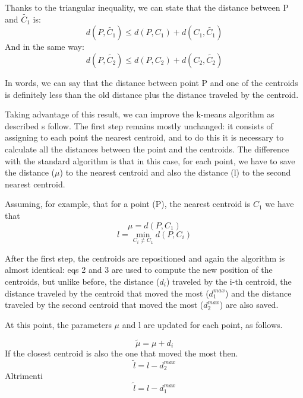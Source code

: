 \documentclass{report}
\begin{document}
\begin{minipage}[b]{0.48\textwidth}
  Thanks to the triangular inequality, we can state that the distance between P and $\tilde{C_1}$ is:
  \begin{equation}
      d(P, \tilde{C_1}) \leq d(P, C_1) + d(C_1, \tilde{C_1})
  \end{equation}
  And in the same way:
  \begin{equation}
    d(P, \tilde{C_2}) \leq d(P, C_2) + d(C_2, \tilde{C_2})
  \end{equation}

  In words, we can say that the distance between point P and one of the centroids is definitely less than the old distance plus the distance traveled by the centroid.

  Taking advantage of this result, we can improve the k-means algorithm as described s follow.
  The first step remains mostly unchanged: it consists of assigning to each point the nearest centroid, and to do this it is necessary to calculate all the distances between the point and the centroids. The difference with the standard algorithm is that in this case, for each point, we have to save the distance ($\mu$) to the nearest centroid and also the distance (l) to the second nearest centroid.

  Assuming, for example, that for a point (P), the nearest centroid is $C_1$ we have that
  \begin{equation}
      \mu = d(P, C_1)
  \end{equation}
  \begin{equation}
      l = \min\limits_{C_i \neq C_1} d(P, C_i)
  \end{equation}

  After the first step, the centroids are repositioned and again the algorithm is almost identical: eqs 2 and 3 are used to compute the new position of the centroids, but unlike before, the distance ($d_i$) traveled by the i-th centroid, the distance traveled by the centroid that moved the most ($d_1^{max}$) and the distance traveled by the second centroid that moved the most ($d_2^{max}$) are also saved.

  At this point, the parameters $\mu$ and l are updated for each point, as follows.

  \begin{equation}
    \tilde{\mu} =  \mu + d_i
  \end{equation}
  If the closest centroid is also the one that moved the most then.
  \begin{equation}
      \tilde{l} = l - d_2^{max}
  \end{equation}
  Altrimenti
  \begin{equation}
      \tilde{l} = l - d_1^{max}
  \end{equation}


\end{minipage}
\end{document}
